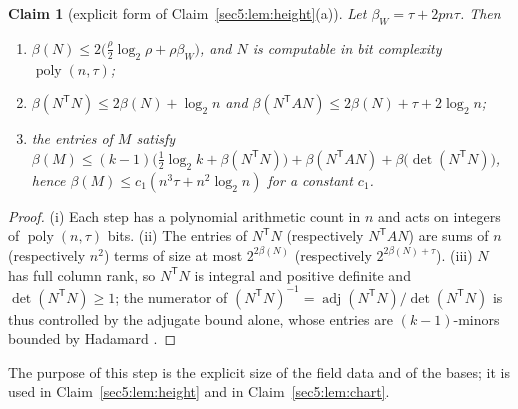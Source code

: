 \documentclass[journal]{IEEEtran}
\theoremstyle{plainn}
\newtheorem{claim}{Claim}
\theoremstyle{remark}
\newcommand{\poly}{\operatorname{poly}}
\begin{document}
\begin{claim}[explicit form of Claim~\ref{sec5:lem:height}(a)]\label{appBC:lem:norm}\label{appBC:lem:comp}\label{appBC:cor:comp}
Let $\beta_W=\tau+2pn\tau$. Then
\begin{enumerate}[label=(\roman*),leftmargin=*]
\item $\beta(N)\le2\bigl(\frac{\rho}{2}\log_2\rho+\rho\beta_W\bigr)$, and $N$ is computable in bit
complexity $\poly(n,\tau)$;
\item $\beta(N^{\mathsf T}N)\le2\beta(N)+\log_2 n$ and
$\beta(N^{\mathsf T}AN)\le2\beta(N)+\tau+2\log_2 n$;
\item the entries of $M$ satisfy
$\beta(M)\le(k-1)\bigl(\tfrac12\log_2 k+\beta(N^{\mathsf T}N)\bigr)+\beta(N^{\mathsf T}AN)+\beta\bigl(\det(N^{\mathsf T}N)\bigr)$,
hence $\beta(M)\le c_1(n^{3}\tau+n^{2}\log_2 n)$ for a constant $c_1$.
\end{enumerate}
\end{claim}

\begin{proof}
(i) Each step has a polynomial arithmetic count in $n$ and acts on integers of $\poly(n,\tau)$ bits.
(ii) The entries of $N^{\mathsf T}N$ (respectively $N^{\mathsf T}AN$) are sums of $n$ (respectively
$n^{2}$) terms of size at most $2^{2\beta(N)}$ (respectively $2^{2\beta(N)+\tau}$). (iii) $N$ has full
column rank, so $N^{\mathsf T}N$ is integral and positive definite and $\det(N^{\mathsf T}N)\ge1$; the
numerator of $(N^{\mathsf T}N)^{-1}=\operatorname{adj}(N^{\mathsf T}N)/\det(N^{\mathsf T}N)$ is thus
controlled by the adjugate bound alone, whose entries are $(k-1)$-minors bounded by Hadamard
\cite{hj13,vzgg03}.
\end{proof}


The purpose of this step is the explicit size of the field data and of the bases; it is used in
Claim~\ref{sec5:lem:height} and in Claim~\ref{sec5:lem:chart}.
\end{document}
